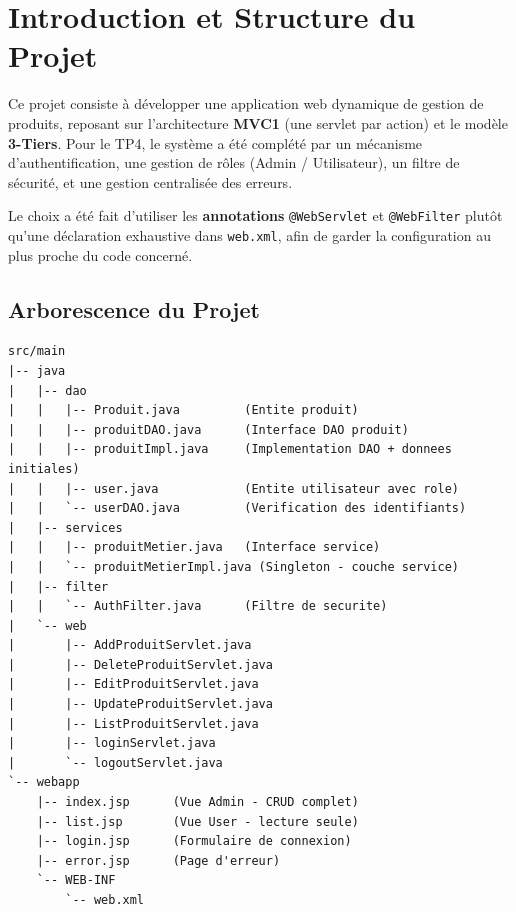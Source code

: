 \documentclass[12pt, a4paper]{article}
\begin{document}
\tableofcontents
\newpage

\section{Introduction et Structure du Projet}

Ce projet consiste à développer une application web dynamique de gestion de produits, reposant sur l'architecture \textbf{MVC1} (une servlet par action) et le modèle \textbf{3-Tiers}. Pour le TP4, le système a été complété par un mécanisme d'authentification, une gestion de rôles (Admin / Utilisateur), un filtre de sécurité, et une gestion centralisée des erreurs.

Le choix a été fait d'utiliser les \textbf{annotations} \texttt{@WebServlet} et \texttt{@WebFilter} plutôt qu'une déclaration exhaustive dans \texttt{web.xml}, afin de garder la configuration au plus proche du code concerné.

\subsection{Arborescence du Projet}

\begin{lstlisting}[basicstyle=\ttfamily\scriptsize, frame=none, backgroundcolor=\color{white}]
src/main
|-- java
|   |-- dao
|   |   |-- Produit.java         (Entite produit)
|   |   |-- produitDAO.java      (Interface DAO produit)
|   |   |-- produitImpl.java     (Implementation DAO + donnees initiales)
|   |   |-- user.java            (Entite utilisateur avec role)
|   |   `-- userDAO.java         (Verification des identifiants)
|   |-- services
|   |   |-- produitMetier.java   (Interface service)
|   |   `-- produitMetierImpl.java (Singleton - couche service)
|   |-- filter
|   |   `-- AuthFilter.java      (Filtre de securite)
|   `-- web
|       |-- AddProduitServlet.java
|       |-- DeleteProduitServlet.java
|       |-- EditProduitServlet.java
|       |-- UpdateProduitServlet.java
|       |-- ListProduitServlet.java
|       |-- loginServlet.java
|       `-- logoutServlet.java
`-- webapp
    |-- index.jsp      (Vue Admin - CRUD complet)
    |-- list.jsp       (Vue User - lecture seule)
    |-- login.jsp      (Formulaire de connexion)
    |-- error.jsp      (Page d'erreur)
    `-- WEB-INF
        `-- web.xml
\end{lstlisting}

\end{document}
